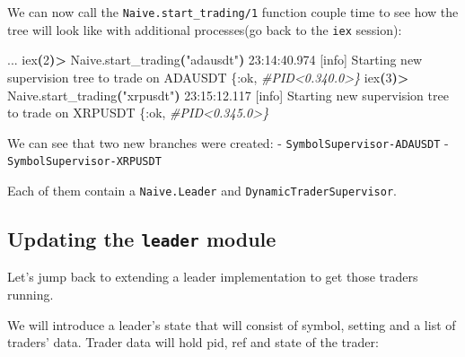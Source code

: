 \documentclass[
]{book}
\newenvironment{Shaded}{\begin{snugshade}}{\end{snugshade}}
\newcommand{\CommentTok}[1]{\textcolor[rgb]{0.56,0.35,0.01}{\textit{#1}}}
\newcommand{\ErrorTok}[1]{\textcolor[rgb]{0.64,0.00,0.00}{\textbf{#1}}}
\newcommand{\ExtensionTok}[1]{#1}
\newcommand{\KeywordTok}[1]{\textcolor[rgb]{0.13,0.29,0.53}{\textbf{#1}}}
\newcommand{\NormalTok}[1]{#1}
\newcommand{\OperatorTok}[1]{\textcolor[rgb]{0.81,0.36,0.00}{\textbf{#1}}}
\newcommand{\StringTok}[1]{\textcolor[rgb]{0.31,0.60,0.02}{#1}}
\begin{document}
We can now call the \texttt{Naive.start\_trading/1} function couple time to see how the tree will look like with additional processes(go back to the \texttt{iex} session):

\begin{Shaded}
\begin{Highlighting}[]
\ExtensionTok{...}
\ExtensionTok{iex}\ErrorTok{(}\ExtensionTok{2}\KeywordTok{)}\OperatorTok{\textgreater{}}\NormalTok{ Naive.start\_trading}\KeywordTok{(}\StringTok{"adausdt"}\KeywordTok{)}
\ExtensionTok{23:14:40.974}\NormalTok{ [info]  Starting new supervision tree to trade on ADAUSDT}
\ExtensionTok{\{:ok,} \CommentTok{\#PID\textless{}0.340.0\textgreater{}\}}
\ExtensionTok{iex}\ErrorTok{(}\ExtensionTok{3}\KeywordTok{)}\OperatorTok{\textgreater{}}\NormalTok{ Naive.start\_trading}\KeywordTok{(}\StringTok{"xrpusdt"}\KeywordTok{)}
\ExtensionTok{23:15:12.117}\NormalTok{ [info]  Starting new supervision tree to trade on XRPUSDT}
\ExtensionTok{\{:ok,} \CommentTok{\#PID\textless{}0.345.0\textgreater{}\}}
\end{Highlighting}
\end{Shaded}

We can see that two new branches were created:
- \texttt{SymbolSupervisor-ADAUSDT}
- \texttt{SymbolSupervisor-XRPUSDT}

Each of them contain a \texttt{Naive.Leader} and \texttt{DynamicTraderSupervisor}.

\hypertarget{updating-the-leader-module}{%
\subsection{\texorpdfstring{Updating the \texttt{leader} module}{Updating the leader module}}\label{updating-the-leader-module}}

Let's jump back to extending a leader implementation to get those traders running.

We will introduce a leader's state that will consist of symbol, setting and a list of traders' data. Trader data will hold pid, ref and state of the trader:
\end{document}
